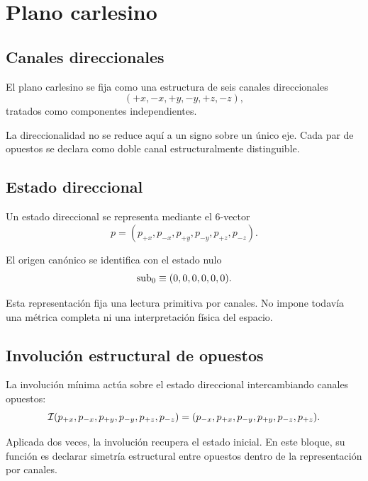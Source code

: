 \chapter{Plano carlesino}

\section{Canales direccionales}
\begin{definition}
El plano carlesino se fija como una estructura de seis canales direccionales
\[
(+x,-x,+y,-y,+z,-z),
\]
tratados como componentes independientes.
\end{definition}

\begin{observation}
La direccionalidad no se reduce aquí a un signo sobre un único eje. Cada par de opuestos se declara como doble canal estructuralmente distinguible.
\end{observation}

\section{Estado direccional}
\begin{definition}
Un estado direccional se representa mediante el 6-vector
\[
p=(p_{+x},p_{-x},p_{+y},p_{-y},p_{+z},p_{-z}).
\]
\end{definition}

\begin{definition}
El origen canónico se identifica con el estado nulo
\[
\mathrm{sub}_{0} \equiv (0,0,0,0,0,0).
\]
\end{definition}

\begin{observation}
Esta representación fija una lectura primitiva por canales. No impone todavía una métrica completa ni una interpretación física del espacio.
\end{observation}

\section{Involución estructural de opuestos}
\begin{definition}
La involución mínima actúa sobre el estado direccional intercambiando canales opuestos:
\[
\mathcal I(p_{+x},p_{-x},p_{+y},p_{-y},p_{+z},p_{-z})
=
(p_{-x},p_{+x},p_{-y},p_{+y},p_{-z},p_{+z}).
\]
\end{definition}

\begin{observation}
Aplicada dos veces, la involución recupera el estado inicial. En este bloque, su función es declarar simetría estructural entre opuestos dentro de la representación por canales.
\end{observation}

